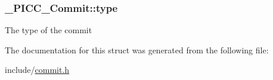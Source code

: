 \hypertarget{struct__PICC__Commit_a3300308e83e1bd4843a73089906a25a9}{
\subsubsection[{type}]{ \-\_\-\-P\-I\-C\-C\-\_\-\-Commit\-::type}}\label{struct__PICC__Commit_a3300308e83e1bd4843a73089906a25a9}
The type of the commit 

The documentation for this struct was generated from the following file\-:\begin{DoxyCompactItemize}
\item 
include/\hyperlink{commit_8h}{commit.\-h}\end{DoxyCompactItemize}
